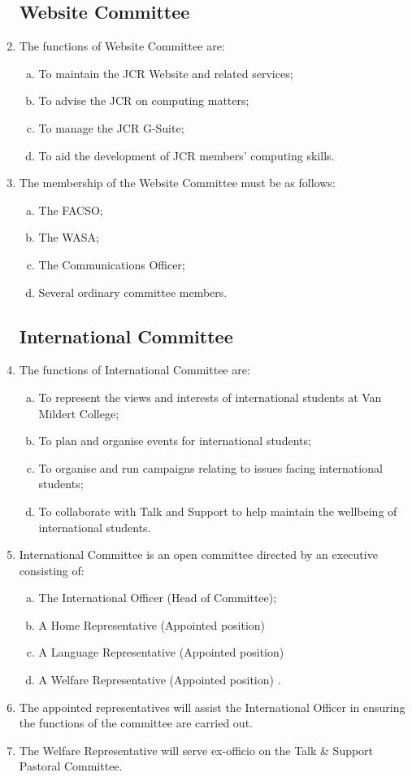 \documentclass[12pt]{article}
\begin{document}
\begin{enumerate}
    \subsection{Website Committee}
    \item The functions of Website Committee are:
    \begin{enumerate}[(a)]
        \item To maintain the JCR Website and related services;
        \item To advise the JCR on computing matters;
        \item To manage the JCR G-Suite;
        \item To aid the development of JCR members' computing skills.
    \end{enumerate}
    \item The membership of the Website Committee must be as follows:
    \begin{enumerate}[(a)]
        \item The FACSO;
        \item The WASA;
        \item The Communications Officer;
        \item Several ordinary committee members.
    \end{enumerate}

    \subsection{International Committee}
    \item The functions of International Committee are:
    \begin{enumerate}[(a)]
        \item To represent the views and interests of international students at Van Mildert College;
        \item To plan and organise events for international students;
        \item To organise and run campaigns relating to issues facing international students;
        \item To collaborate with Talk and Support to help maintain the wellbeing of international students.
    \end{enumerate}
    \item International Committee is an open committee directed by an executive consisting of:
    \begin{enumerate}[(a)]
        \item The International Officer (Head of Committee);
        \item A Home Representative (Appointed position)
        \item A Language Representative (Appointed position)
        \item A Welfare Representative (Appointed position)
.
    \end{enumerate}
    \item The appointed representatives will assist the International Officer in ensuring the functions of the committee are carried out.
    \item The Welfare Representative will serve ex-officio on the Talk \& Support Pastoral Committee.


\end{enumerate}
\end{document}
